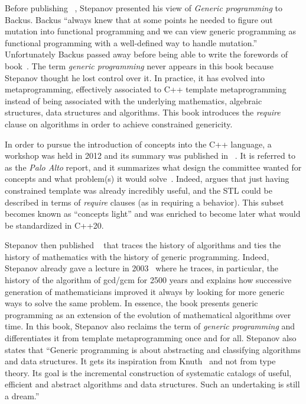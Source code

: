 Before publishing ~\parencite{stepanov.2009.elements}, Stepanov presented his view of
\emph{Generic programming} to Backus. Backus ``always knew that at some points he needed to figure out mutation into
functional programming and we can view generic programming as functional programming with a well-defined way to handle
mutation.'' Unfortunately Backus passed away before being able to write the forewords of
 book~\parencite{parent.2018.generic-programming}. The term \emph{generic programming}
never appears in this book because Stepanov thought he lost control over it. In practice, it has evolved into
metaprogramming, effectively associated to C++ template metaprogramming instead of being associated with the underlying
mathematics, algebraic structures, data structures and algorithms. This book introduces the \emph{require} clause on
algorithms in order to achieve constrained genericity.

In order to pursue the introduction of concepts into the C++ language, a workshop was held in 2012 and its summary was
published in ~\parencite{sutton.2012.concepts}. It is referred to as the \emph{Palo
  Alto} report, and it summarizes what design the committee wanted for concepts and what problem(s) it would
solve~\parencite{stroustrup.2012.concept}. Indeed,  argues that just having
constrained template was already incredibly useful, and the STL could be described in terms of \emph{require} clauses
(as in requiring a behavior). This subset becomes known as ``concepts light'' and was enriched to become later what
would be standardized in C++20.

Stepanov then published ~\parencite{stepanov.2014.mathematics} that traces the
history of algorithms and ties the history of mathematics with the history of generic programming. Indeed, Stepanov
already gave a lecture in 2003~\parencite{stepanov.2003.gcm} where he traces, in particular, the history of the
algorithm of gcd/gcm for 2500 years and explains how successive generation of mathematicians improved it always by
looking for more generic ways to solve the same problem. In essence, the book presents generic programming as an
extension of the evolution of mathematical algorithms over time. In this book, Stepanov also reclaims the term of
\emph{generic programming} and differentiates it from template metaprogramming once and for all. Stepanov also states
that ``Generic programming is about abstracting and classifying algorithms and data structures. It gets its inspiration
from Knuth~\parencite{knuth.2014.art} and not from type theory. Its goal is the incremental construction of systematic
catalogs of useful, efficient and abstract algorithms and data structures. Such an undertaking is still a dream.''


